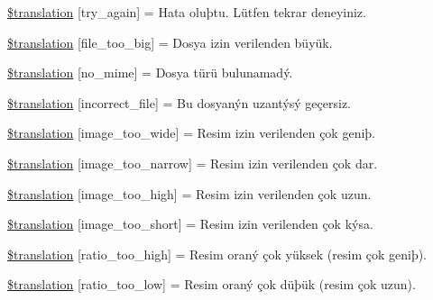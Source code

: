 \begin{DoxyCompactItemize}
\item 
\hyperlink{class_8upload_8tr___t_r_8php_a3afc377bd803683314f413a814243066}{\$translation} \mbox{[}\textquotesingle{}try\+\_\+again\textquotesingle{}\mbox{]} = \textquotesingle{}Hata oluþtu. Lütfen tekrar deneyiniz.\textquotesingle{}
\item 
\hyperlink{class_8upload_8tr___t_r_8php_a476278eb4a0c3df56af068e2d511a741}{\$translation} \mbox{[}\textquotesingle{}file\+\_\+too\+\_\+big\textquotesingle{}\mbox{]} = \textquotesingle{}Dosya izin verilenden büyük.\textquotesingle{}
\item 
\hyperlink{class_8upload_8tr___t_r_8php_a191a55df8e3bb7f3c51b70f3c1932e02}{\$translation} \mbox{[}\textquotesingle{}no\+\_\+mime\textquotesingle{}\mbox{]} = \textquotesingle{}Dosya türü bulunamadý.\textquotesingle{}
\item 
\hyperlink{class_8upload_8tr___t_r_8php_a4d32343e2699edd6fd435f9c832cb9c7}{\$translation} \mbox{[}\textquotesingle{}incorrect\+\_\+file\textquotesingle{}\mbox{]} = \textquotesingle{}Bu dosyanýn uzantýsý geçersiz.\textquotesingle{}
\item 
\hyperlink{class_8upload_8tr___t_r_8php_a0dd3e4930ca1f59ae280f4b1006525cd}{\$translation} \mbox{[}\textquotesingle{}image\+\_\+too\+\_\+wide\textquotesingle{}\mbox{]} = \textquotesingle{}Resim izin verilenden çok geniþ.\textquotesingle{}
\item 
\hyperlink{class_8upload_8tr___t_r_8php_a5c9a4cd67fd21c32e0a3b434591a6037}{\$translation} \mbox{[}\textquotesingle{}image\+\_\+too\+\_\+narrow\textquotesingle{}\mbox{]} = \textquotesingle{}Resim izin verilenden çok dar.\textquotesingle{}
\item 
\hyperlink{class_8upload_8tr___t_r_8php_aa27bde361343f3b63c7cd441860024f8}{\$translation} \mbox{[}\textquotesingle{}image\+\_\+too\+\_\+high\textquotesingle{}\mbox{]} = \textquotesingle{}Resim izin verilenden çok uzun.\textquotesingle{}
\item 
\hyperlink{class_8upload_8tr___t_r_8php_a86fcd4e1157b00032df451188d735527}{\$translation} \mbox{[}\textquotesingle{}image\+\_\+too\+\_\+short\textquotesingle{}\mbox{]} = \textquotesingle{}Resim izin verilenden çok kýsa.\textquotesingle{}
\item 
\hyperlink{class_8upload_8tr___t_r_8php_a23396f6ce7f31e5e5f1b57580621d982}{\$translation} \mbox{[}\textquotesingle{}ratio\+\_\+too\+\_\+high\textquotesingle{}\mbox{]} = \textquotesingle{}Resim oraný çok yüksek (resim çok geniþ).\textquotesingle{}
\item 
\hyperlink{class_8upload_8tr___t_r_8php_ac533b9a479f056b0b8623e4268f068c2}{\$translation} \mbox{[}\textquotesingle{}ratio\+\_\+too\+\_\+low\textquotesingle{}\mbox{]} = \textquotesingle{}Resim oraný çok düþük (resim çok uzun).\textquotesingle{}

\end{DoxyCompactItemize}
